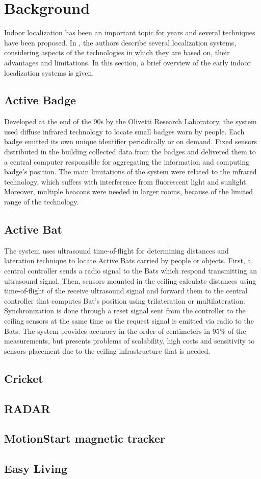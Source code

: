 \section{Background}

Indoor localization has been an important topic for years and several techniques have been proposed. In \cite{locSysUbiComp}, the authors describe several localization systems, considering aspects of the technologies in which they are based on, their advantages and limitations. In this section, a brief overview of the early indoor localization systems is given.

\subsection{Active Badge}
Developed at the end of the 90s by the Olivetti Research Laboratory, the system used diffuse infrared technology to locate small badges worn by people. Each badge emitted its own unique identifier periodically or on demand. Fixed sensors distributed in the building collected data from the badges and delivered them to a central computer responsible for aggregating the information and computing badge's position. The main limitations of the system were related to the infrared technology, which suffers with interference from fluorescent light and sunlight. Moreover, multiple beacons were needed in larger rooms, because of the limited range of the technology.

\subsection{Active Bat}
The system uses ultrasound time-of-flight for determining distances and lateration technique to locate Active Bats carried by people or objects. First, a central controller sends a radio signal to the Bats which respond transmitting an ultrasound signal. Then, sensors mounted in the ceiling calculate distances using time-of-flight of the receive ultrasound signal and forward them to the central controller that computes Bat's position using trilateration or multilateration. Synchronization is done through a reset signal sent from the controller to the ceiling sensors at the same time as the request signal is emitted via radio to the Bats. The system provides accuracy in the order of centimeters in 95\% of the measurements, but presents problems of scalability, high costs and sensitivity to sensors placement due to the ceiling infrastructure that is needed.

\subsection{Cricket}


\subsection{RADAR}
\subsection{MotionStart magnetic tracker}
\subsection{Easy Living}

